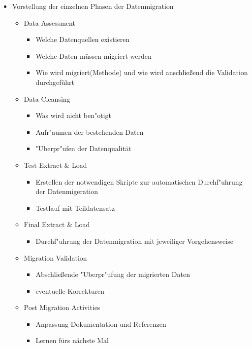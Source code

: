 \documentclass[11pt]{scrartcl}
\begin{document}
\begin{itemize}
	\item Vorstellung der einzelnen Phasen der Datenmigration
	\begin{itemize}
		\item Data Assessment
		\begin{itemize}
			\item Welche Datenquellen existieren
			\item Welche Daten müssen migriert werden
			\item Wie wird migriert(Methode) und wie wird anschließend die Validation durchgeführt
		\end{itemize}
		
		\item Data Cleansing
		\begin{itemize}
			\item Was wird nicht ben"otigt
			\item Aufr"aumen der bestehenden Daten
			\item "Uberpr"ufen der Datenqualität
		\end{itemize}
		
		\item Test Extract \& Load
		\begin{itemize}
			\item Erstellen der notwendigen Skripte zur automatischen Durchf"uhrung der Datenmigeration 
			\item Testlauf mit Teildatensatz
		\end{itemize}
		
		\item Final Extract \& Load
		\begin{itemize}
			\item Durchf"uhrung der Datenmigration mit jeweiliger Vorgehensweise
		\end{itemize}
		
		\item Migration Validation
		\begin{itemize}
			\item Abschließende "Uberpr"ufung der migrierten Daten
			\item eventuelle Korrekturen
		\end{itemize}
		
		\item Post Migration Activities
		\begin{itemize}
			\item Anpassung Dokumentation und Referenzen
			\item Lernen fürs nächste Mal
		\end{itemize}
		
	\end{itemize}
\end{itemize}
\end{document}
